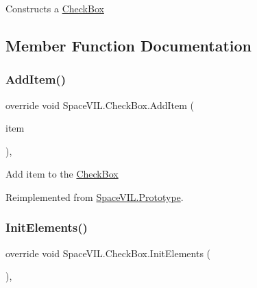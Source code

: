 Constructs a \mbox{\hyperlink{class_space_v_i_l_1_1_check_box}{Check\+Box}} 



\subsection{Member Function Documentation}
\mbox{\label{class_space_v_i_l_1_1_check_box_a4effb830a35810780edb874d9ba05cfe}} 
\subsubsection{\texorpdfstring{Add\+Item()}{AddItem()}}
{\footnotesize\ttfamily override void Space\+V\+I\+L.\+Check\+Box.\+Add\+Item (\begin{DoxyParamCaption}\item[{\mbox{\hyperlink{interface_space_v_i_l_1_1_core_1_1_i_base_item}{I\+Base\+Item}}}]{item }\end{DoxyParamCaption})\hspace{0.3cm}{\ttfamily [inline]}, {\ttfamily [virtual]}}



Add item to the \mbox{\hyperlink{class_space_v_i_l_1_1_check_box}{Check\+Box}} 



Reimplemented from \mbox{\hyperlink{class_space_v_i_l_1_1_prototype}{Space\+V\+I\+L.\+Prototype}}.

\mbox{\label{class_space_v_i_l_1_1_check_box_a5e4b6ce5dd4e68da0cf678025a7fb0fb}} 
\subsubsection{\texorpdfstring{Init\+Elements()}{InitElements()}}
{\footnotesize\ttfamily override void Space\+V\+I\+L.\+Check\+Box.\+Init\+Elements (\begin{DoxyParamCaption}{ }\end{DoxyParamCaption})\hspace{0.3cm}{\ttfamily [inline]}, {\ttfamily [virtual]}}



